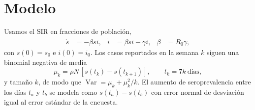 \section{Modelo}
Usamos el SIR en fracciones de población,
\begin{align}
  \dot s &= -\beta s i, & \dot i &= \beta s i - \gamma i, & \beta &= R_0\gamma,
\end{align}
con $s(0)=s_0$ e $i(0)=i_0$. Los casos reportados en la semana $k$ siguen
una binomial negativa de media
\begin{equation}
  \mu_k = \rho N\,[s(t_k) - s(t_{k+1})], \qquad t_k = 7k\ \text{días},
  \label{eq:mu}
\end{equation}
y tamaño $k$, de modo que $\operatorname{Var} = \mu_k + \mu_k^2/k$.
El aumento de seroprevalencia entre los días $t_a$ y $t_b$ se modela como
$s(t_a)-s(t_b)$ con error normal de desviación igual al error estándar de
la encuesta.
